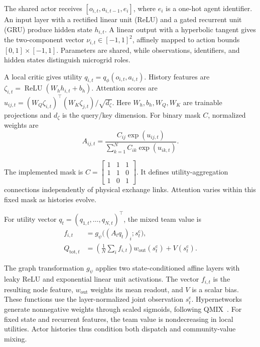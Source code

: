 The shared actor receives $[o_{i,t},a_{i,t-1},e_i]$, where $e_i$ is a
one-hot agent identifier. An input layer with a rectified linear unit (ReLU)
and a gated recurrent unit (GRU) produce hidden state $h_{i,t}$.
A linear output with a hyperbolic tangent gives the two-component vector
$\nu_{i,t}\in[-1,1]^2$, affinely mapped to action bounds
$[0,1]\times[-1,1]$. Parameters are shared, while observations,
identifiers, and hidden states distinguish microgrid roles.

A local critic gives utility $q_{i,t}=q_\phi(o_{i,t},a_{i,t})$.
History features are $\zeta_{i,t}=\operatorname{ReLU}(W_hh_{i,t}+b_h)$.
Attention scores are
$u_{ij,t}=(W_Q\zeta_{i,t})^\top(W_K\zeta_{j,t})/\sqrt{d_\zeta}$.
Here $W_h,b_h,W_Q,W_K$ are trainable projections and $d_\zeta$ is the
query/key dimension. For binary mask $C$, normalized weights are
\begin{equation}
 A_{ij,t}=\frac{C_{ij}\exp(u_{ij,t})}
                    {\sum_{k=1}^{N}C_{ik}\exp(u_{ik,t})}.
 \label{eq:mixer-attention}
\end{equation}

The implemented mask is
$C=\left[\begin{smallmatrix}1&1&1\\1&1&0\\1&0&1\end{smallmatrix}\right]$.
It defines utility-aggregation connections independently of physical
exchange links. Attention varies within this fixed mask as histories evolve.

For utility vector $q_t=(q_{1,t},\ldots,q_{N,t})^\top$, the mixed team
value is
\begin{equation}
 \begin{aligned}
 f_{i,t}&=g_\psi\big((A_tq_t)_i;s_t^{\mathrm{c}}\big),\\
 Q_{\mathrm{tot},t}
 &=\left(\frac1N\sum_i f_{i,t}\right)
          w_{\mathrm{out}}(s_t^{\mathrm{c}})+V(s_t^{\mathrm{c}}).
 \end{aligned}
 \label{eq:graph-value}
\end{equation}

The graph transformation $g_\psi$ applies two state-conditioned affine
layers with leaky ReLU and exponential linear unit activations.
The vector $f_{i,t}$ is the resulting node feature,
$w_{\mathrm{out}}$ weights its mean readout, and $V$ is a scalar bias.
These functions use the layer-normalized joint observation
$s_t^{\mathrm{c}}$. Hypernetworks generate nonnegative weights through
scaled sigmoids, following QMIX~\cite{qmix2018}. For fixed state and
recurrent features, the team value is nondecreasing in local utilities.
Actor histories thus condition both dispatch and community-value mixing.

